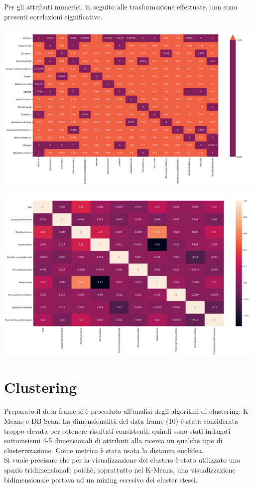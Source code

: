 \documentclass[english]{article}
\begin{document}
Per gli attributi numerici, in seguito alle trasformazione effettuate, non sono presenti corelazioni significative.

\begin{center}
\includegraphics[scale=1.2]{mccat.png}
\end{center}

\begin{center}
\includegraphics[scale=1.2]{macnum.png}
\end{center}

\section{Clustering}
Preparato il data frame si è proceduto all'analisi degli algoritmi di clustering: K-Means e DB Scan. La dimensionalità del data frame ($10$) è stata considerata troppo elevata per ottenere risultati consistenti, quindi sono stati indagati sottoinsiemi 4-5 dimensionali di attributi alla ricerca un qualche tipo di clusterizzazione. Come metrica è stata usata la distanza euclidea.\\
Si vuole precisare che per la visualizzazione dei clusters è stato utilizzato uno spazio tridimensionale poichè, soprattutto nel K-Means, una visualizzazione bidimensionale portava ad un mixing eccesivo dei cluster stessi.
\end{document}
